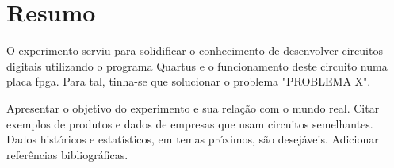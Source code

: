\chapter{Resumo}
O experimento serviu para solidificar o conhecimento de desenvolver circuitos digitais utilizando o
programa Quartus e o funcionamento deste circuito numa placa \ac{fpga}. Para tal, tinha-se que solucionar
o problema "PROBLEMA X".

Apresentar  o  objetivo  do  experimento e  sua  relação  com  o  mundo  real.
Citar exemplos  de  produtos  e  dados  de  empresas  que  usam  circuitos  semelhantes.
Dados  históricos  e  estatísticos,  em  temas  próximos,  são  desejáveis.
Adicionar referências bibliográficas.
